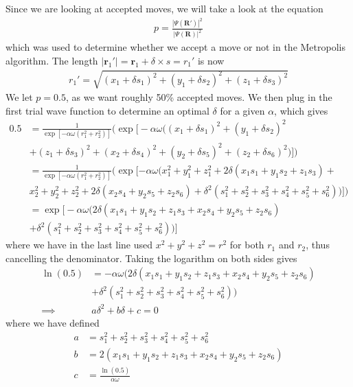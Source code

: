 \documentclass[12pt]{article}
\begin{document}
Since we are looking at accepted moves, we will take a look at the equation
\begin{align*}
p = \frac{|\Psi(\mathbf{R'})|^2}{|\Psi(\mathbf{R})|^2}
\end{align*}
which was used to determine whether we accept a move or not in the Metropolis algorithm. The length $|\mathbf{r}_1'| = \mathbf{r}_1 + \delta \times s = r_1'$ is now
\begin{align*}
r_1' = \sqrt{(x_1 + \delta s_1)^2 + (y_1 + \delta s_2)^2 + (z_1 + \delta s_3)^2}
\end{align*} We let $p = 0.5$, as we want roughly 50\% accepted moves. We then plug in the first trial wave function to determine an optimal $\delta$ for a given $\alpha$, which gives
\begin{align*}
0.5 &= \frac{1}{\exp\left[-\alpha \omega(r_1^2+r_2^2) \right]} \big(\exp\big[-\alpha \omega \big((x_1 + \delta s_1)^2 + (y_1 + \delta s_2)^2  \\
& + (z_1 + \delta s_3)^2 + (x_2 + \delta s_4)^2 + (y_2 + \delta s_5)^2 + (z_2 + \delta s_6)^2\big)\big]\big) \\
&= \frac{1}{\exp[-\alpha \omega (r_1^2 + r_2^2)]}\big(\exp[-\alpha \omega\big(x_1^2 + y_1^2 + z_1^2 + 2\delta(x_1s_1 + y_1s_2 + z_1s_3) + \\
& x_2^2 + y_2^2 + z_2^2 + 2\delta(x_2s_4 + y_2s_5 + z_2 s_6) +\delta^2(s_1^2 + s_2^2 + s_3^2 + s_4^2 + s_5^2 + s_6^2) \big)]  \big) \\
&= \exp\big[-\alpha \omega\big(2\delta(x_1s_1 + y_1s_2 + z _1s_3 + x_2s_4 + y_2s_5 + z_2 s_6) \\
& +\delta^2(s_1^2 + s_2^2 + s_3^2 + s_4^2 + s_5^2 + s_6^2) \big) \big]
\end{align*}
where we have in the last line used  $x^2 + y^2 + z^2 = r^2$ for both $r_1$ and $r_2$, thus cancelling the denominator. Taking the logarithm on both sides gives
\begin{align*}
\ln(0.5) &= -\alpha \omega\big(2\delta(x_1s_1 + y_1s_2 + z _1s_3 + x_2s_4 + y_2s_5 + z_2 s_6) \\
& +\delta^2(s_1^2 + s_2^2 + s_3^2 + s_4^2 + s_5^2 + s_6^2) \big) \\
\implies & a\delta^2 + b\delta + c = 0
\end{align*}
where we have defined
\begin{align*}
a &= s_1^2 + s_2^2 + s_3^2 + s_4^2 + s_5^2 + s_6^2 \\
b &= 2(x_1s_1 + y_1s_2 + z _1s_3 + x_2s_4 + y_2s_5 + z_2 s_6) \\
c &= \frac{\ln(0.5)}{\alpha \omega}
\end{align*}
\end{document}
